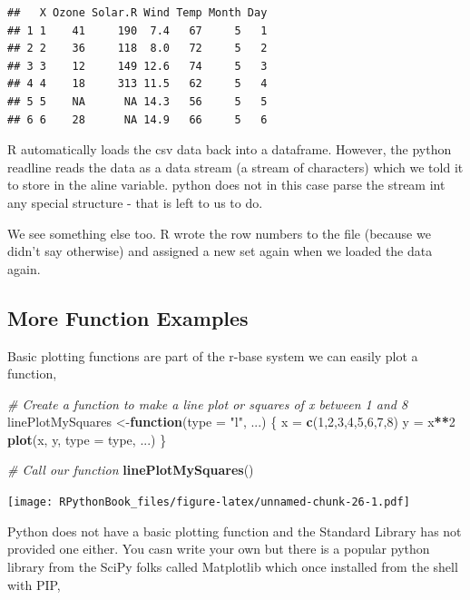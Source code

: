 \documentclass[]{book}
\newenvironment{Shaded}{\begin{snugshade}}{\end{snugshade}}
\newcommand{\KeywordTok}[1]{\textcolor[rgb]{0.13,0.29,0.53}{\textbf{#1}}}
\newcommand{\DataTypeTok}[1]{\textcolor[rgb]{0.13,0.29,0.53}{#1}}
\newcommand{\DecValTok}[1]{\textcolor[rgb]{0.00,0.00,0.81}{#1}}
\newcommand{\StringTok}[1]{\textcolor[rgb]{0.31,0.60,0.02}{#1}}
\newcommand{\CommentTok}[1]{\textcolor[rgb]{0.56,0.35,0.01}{\textit{#1}}}
\newcommand{\ControlFlowTok}[1]{\textcolor[rgb]{0.13,0.29,0.53}{\textbf{#1}}}
\newcommand{\OperatorTok}[1]{\textcolor[rgb]{0.81,0.36,0.00}{\textbf{#1}}}
\newcommand{\NormalTok}[1]{#1}
\theoremstyle{definition}
\theoremstyle{definition}
\theoremstyle{definition}
\theoremstyle{remark}
\begin{document}
\begin{verbatim}
##   X Ozone Solar.R Wind Temp Month Day
## 1 1    41     190  7.4   67     5   1
## 2 2    36     118  8.0   72     5   2
## 3 3    12     149 12.6   74     5   3
## 4 4    18     313 11.5   62     5   4
## 5 5    NA      NA 14.3   56     5   5
## 6 6    28      NA 14.9   66     5   6
\end{verbatim}

R automatically loads the csv data back into a dataframe. However, the
python readline reads the data as a data stream (a stream of characters)
which we told it to store in the aline variable. python does not in this
case parse the stream int any special structure - that is left to us to
do.

We see something else too. R wrote the row numbers to the file (because
we didn't say otherwise) and assigned a new set again when we loaded the
data again.

\subsection{More Function Examples}\label{more-function-examples}

Basic plotting functions are part of the r-base system we can easily
plot a function,

\begin{Shaded}
\begin{Highlighting}[]
\CommentTok{# Create a function to make a line plot or squares of x between 1 and 8}
\NormalTok{linePlotMySquares <-}\ControlFlowTok{function}\NormalTok{(}\DataTypeTok{type =} \StringTok{"l"}\NormalTok{, ...) \{}
\NormalTok{  x =}\StringTok{ }\KeywordTok{c}\NormalTok{(}\DecValTok{1}\NormalTok{,}\DecValTok{2}\NormalTok{,}\DecValTok{3}\NormalTok{,}\DecValTok{4}\NormalTok{,}\DecValTok{5}\NormalTok{,}\DecValTok{6}\NormalTok{,}\DecValTok{7}\NormalTok{,}\DecValTok{8}\NormalTok{)}
\NormalTok{  y =}\StringTok{ }\NormalTok{x}\OperatorTok{**}\DecValTok{2}
  \KeywordTok{plot}\NormalTok{(x, y, }\DataTypeTok{type =}\NormalTok{ type, ...)}
\NormalTok{\}}

\CommentTok{# Call our function}
\KeywordTok{linePlotMySquares}\NormalTok{()}
\end{Highlighting}
\end{Shaded}

\texttt{[image: RPythonBook\_files/figure-latex/unnamed-chunk-26-1.pdf]}

Python does not have a basic plotting function and the Standard Library
has not provided one either. You casn write your own but there is a
popular python library from the SciPy folks called Matplotlib which once
installed from the shell with PIP,
\end{document}
